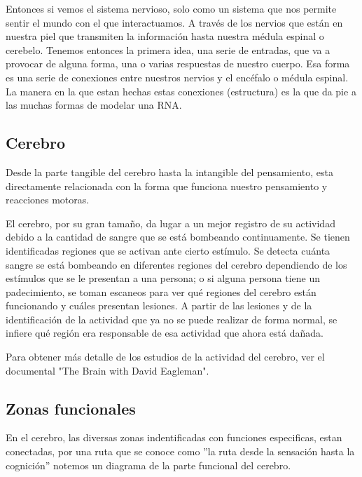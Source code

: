 Entonces si vemos el sistema nervioso, solo como un sistema que nos permite sentir el mundo con el que interactuamos. A través de los nervios que están en nuestra piel que transmiten la información hasta nuestra médula espinal o cerebelo. Tenemos entonces la primera idea, una serie de entradas, que va a provocar de alguna forma, una o varias respuestas de nuestro cuerpo. Esa forma es una serie de conexiones entre nuestros nervios y el encéfalo o médula espinal. La manera en la que estan hechas estas conexiones (estructura) es la que da pie a las muchas formas de modelar una RNA.

\subsection{Cerebro}

Desde la parte tangible del cerebro hasta la intangible del pensamiento, esta directamente relacionada con la forma que funciona nuestro pensamiento y reacciones motoras.

El cerebro, por su gran tamaño, da lugar a un mejor registro de su actividad debido a la cantidad de sangre que se está bombeando continuamente. Se tienen identificadas regiones que se activan ante cierto estímulo.\cite{neurona_A_cerebro} Se detecta cuánta sangre se está bombeando en diferentes regiones del cerebro dependiendo de los estímulos que se le presentan a una persona; o si alguna persona tiene un padecimiento, se toman escaneos para ver qué regiones del cerebro están funcionando y cuáles presentan lesiones. A partir de las lesiones y de la identificación de la actividad que ya no se puede realizar de forma normal, se infiere qué región era responsable de esa actividad que ahora está dañada.\cite{estudiosF}

Para obtener más detalle de los estudios de la actividad del cerebro, ver el documental "The Brain with David Eagleman".

\subsection{Zonas funcionales}

En el cerebro, las diversas zonas indentificadas con funciones especificas, estan conectadas, por una ruta que se conoce como 
 ''la ruta desde la sensación hasta la cognición'' notemos un diagrama de la parte funcional del cerebro. \cite{sensAcogn}  



